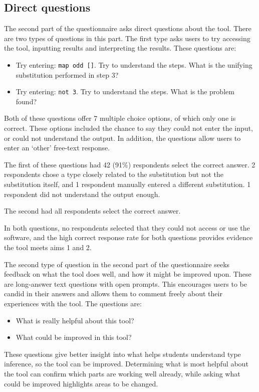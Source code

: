 \documentclass[a4paper,fleqn,oneside,12pt]{report}
\begin{document}
\subsection{Direct questions}\label{id:h.abykou9pzwwh}
The second part of the questionnaire asks direct questions about the tool. There are two types of questions in this part. The first type asks users to try accessing the tool, inputting results and interpreting the results. These questions are:
\begin{itemize}
  \item Try entering: \texttt{map odd []}. Try to understand the steps. What is the unifying substitution performed in step 3?
  \item Try entering: \texttt{not 3}. Try to understand the steps. What is the problem found?
\end{itemize}
Both of these questions offer 7 multiple choice options, of which only one is correct. These options included the chance to say they could not enter the input, or could not understand the output. In addition, the questions allow users to enter an ‘other’ free-text response.

The first of these questions had 42 (91\%) respondents select the correct answer. 2 respondents chose a type closely related to the substitution but not the substitution itself, and 1 respondent manually entered a different substitution. 1 respondent did not understand the output enough.

The second had all respondents select the correct answer.

In both questions, no respondents selected that they could not access or use the software, and the high correct response rate for both questions provides evidence the tool meets aims 1 and 2.

The second type of question in the second part of the questionnaire seeks feedback on what the tool does well, and how it might be improved upon. These are long-answer text questions with open prompts. This encourages users to be candid in their answers and allows them to comment freely about their experiences with the tool. The questions are:
\begin{itemize}
  \item What is really helpful about this tool?
  \item What could be improved in this tool?
\end{itemize}

These questions give better insight into what helps students understand type inference, so the tool can be improved. Determining what is most helpful about the tool can confirm which parts are working well already, while asking what could be improved highlights areas to be changed.
\end{document}

